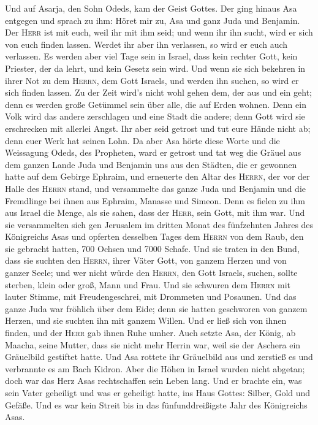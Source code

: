  Und auf Asarja, den Sohn Odeds, kam der Geist Gottes.
 Der ging hinaus Asa entgegen und sprach zu ihm: Höret mir
zu, Asa und ganz Juda und Benjamin. Der \textsc{Herr} ist mit euch, weil
ihr mit ihm seid; und wenn ihr ihn sucht, wird er sich von euch finden
lassen. Werdet ihr aber ihn verlassen, so wird er euch auch verlassen.
 Es werden aber viel Tage sein in Israel, dass kein
rechter Gott, kein Priester, der da lehrt, und kein Gesetz sein wird.
 Und wenn sie sich bekehren in ihrer Not zu dem
\textsc{Herrn}, dem Gott Israels, und werden ihn suchen, so wird er sich
finden lassen.  Zu der Zeit wird's nicht wohl gehen dem,
der aus und ein geht; denn es werden große Getümmel sein über alle, die
auf Erden wohnen.  Denn ein Volk wird das andere
zerschlagen und eine Stadt die andere; denn Gott wird sie erschrecken
mit allerlei Angst.  Ihr aber seid getrost und tut eure
Hände nicht ab; denn euer Werk hat seinen Lohn.  Da aber
Asa hörte diese Worte und die Weissagung Odeds, des Propheten, ward er
getrost und tat weg die Gräuel aus dem ganzen Lande Juda und Benjamin
uns aus den Städten, die er gewonnen hatte auf dem Gebirge Ephraim, und
erneuerte den Altar des \textsc{Herrn}, der vor der Halle des
\textsc{Herrn} stand,  und versammelte das ganze Juda und
Benjamin und die Fremdlinge bei ihnen aus Ephraim, Manasse und Simeon.
Denn es fielen zu ihm aus Israel die Menge, als sie sahen, dass der
\textsc{Herr}, sein Gott, mit ihm war.  Und sie
versammelten sich gen Jerusalem im dritten Monat des fünfzehnten Jahres
des Königreichs Asas  und opferten desselben Tages dem
\textsc{Herrn} von dem Raub, den sie gebracht hatten, 700 Ochsen und
7000 Schafe.  Und sie traten in den Bund, dass sie
suchten den \textsc{Herrn}, ihrer Väter Gott, von ganzem Herzen und von
ganzer Seele;  und wer nicht würde den \textsc{Herrn},
den Gott Israels, suchen, sollte sterben, klein oder groß, Mann und
Frau.  Und sie schwuren dem \textsc{Herrn} mit lauter
Stimme, mit Freudengeschrei, mit Drommeten und Posaunen. 
Und das ganze Juda war fröhlich über dem Eide; denn sie hatten
geschworen von ganzem Herzen, und sie suchten ihn mit ganzem Willen. Und
er ließ sich von ihnen finden, und der \textsc{Herr} gab ihnen Ruhe
umher.  Auch setzte Asa, der König, ab Maacha, seine
Mutter, dass sie nicht mehr Herrin war, weil sie der Aschera ein
Gräuelbild gestiftet hatte. Und Asa rottete ihr Gräuelbild aus und
zerstieß es und verbrannte es am Bach Kidron.  Aber die
Höhen in Israel wurden nicht abgetan; doch war das Herz Asas
rechtschaffen sein Leben lang.  Und er brachte ein, was
sein Vater geheiligt und was er geheiligt hatte, ins Haus Gottes:
Silber, Gold und Gefäße.  Und es war kein Streit bis in
das fünfunddreißigste Jahr des Königreichs Asas.

